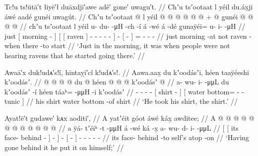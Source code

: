 \ex\label{ex:91-227-started-going-before-ravens}%
%
\begingl
	\glpreamble	Tc!u ts!ūtā′t łiyē′ł duāxdjī′awe adê′ g̣one′ uwagu′t. //
	\glpreamble	Chʼu tsʼootaat l yéil du.áx̱ji áwé aadé g̱unéi uwagút. //
	\gla	Chʼu {} tsʼootaat @ {} {}
		{} l {} yéil {}  @ {} @ {} @ {} @ {} @ {} {}
		 @ {} +
		{}  @ {} {}
		g̱unéi @  @ {} @ {} @ {} //
	\glb	chʼu {} tsʼootaat {} {}
		{} l {} yéil {} u- du-  -μH -ch -í {}
		á -wé
		{} á -dé {}
		g̱unaÿéi= u- i-  -μH //
	\glc	just {}[ morning - {}]
		{}[  {}[ raven {}] - -
			 - - - {}]
		 -
		{}[  - {}]
		= - -  - //
	\gld	just {} morning -at {}
		{} not {} raven {}
			 {} {} {} {} -when {}
		 {}
		{} there -to {}
		start  {} {} {} //
	\glft	‘Just in the morning, it was when people were not hearing ravens that he started going there.’
		//
\endgl
\xe

\ex\label{ex:91-228-took-his-shirt}%
%
\begingl
	\glpreamble	Awaā′x duk!udᴀ′s!î, hīntaỵī′cî k!udᴀ′s!. //
	\glpreamble	Aawa.aax̱ du kʼoodásʼi, héen taaÿéeshi kʼoodásʼ. //
	\gla	{} @ {} @ {} @ {} @ {}
		{} du  @ {} {}
		{} héen  @ {} @ {} @ {} kʼoodásʼ @ {} //
	\glb	a- wu- i-  -μμL
		{} du kʼoodásʼ -í {}
		{} héen táaᵏ=  -μμH -i kʼoodásʼ {} //
	\glc	{}- - -  -
		{}[  shirt - {}]
		{}[ water bottom=  - - tunic {}] //
	\gld	{} {} {} {} {}
		{} his shirt {} {}
		{} water bottom  {} -of shirt {} //
	\glft	‘He took his shirt, the  shirt.’
		//
\endgl
\xe

\ex\label{ex:91-229-going-behind-put-it-on}%
%
\begingl
	\glpreamble	Ayat!ē′t gudawe′ kᴀx aoditi′, //
	\glpreamble	A yatʼéit góot áwé káx̱ awditee; //
	\gla	{} {} A  @ {} @ {} {}  @ {} @ {} @ {} {}
		 @ {}
		{} {}  @ {} {}
		 @ {} @ {} @ {} @ {} @ {} //
	\glb	{} {} a ÿá- tʼéiᵏ -t {} {}  -μμH {} {}
		á -wé
		{} {} ká -x̱ {}
		a- wu- d- i-  -μμL //
	\glc	{}[ {}[ its face- behind - {}]
			\·  - \· {}]
		 -
		{}[   - {}]
		- - - -  - //
	\gld	{} {} its face- behind -to {}  {} {} {} {}
		 {}
		{} self’s atop -on {}
		 {} {} {} {} {} //
	\glft	‘Having gone behind it he put it on himself;’
		//
\endgl
\xe

